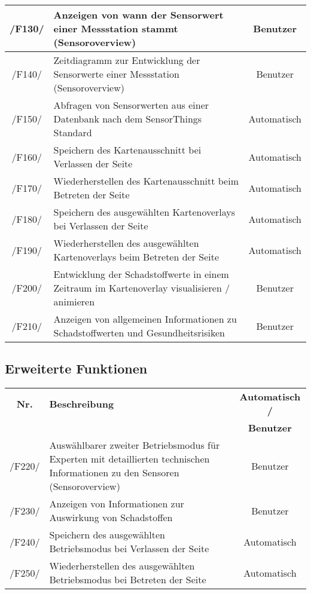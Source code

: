 \begin{tabularx}{\textwidth}{| c | X | c |}
        \hline
        /F130/ & Anzeigen von wann der Sensorwert einer Messstation stammt (Sensoroverview) & Benutzer \\
        \hline
        /F140/ & Zeitdiagramm zur Entwicklung der Sensorwerte einer Messstation (Sensoroverview) & Benutzer \\
        \hline
        /F150/ & Abfragen von Sensorwerten aus einer Datenbank nach dem SensorThings Standard & Automatisch \\
        \hline
        /F160/ & Speichern des Kartenausschnitt bei Verlassen der Seite & Automatisch \\
        \hline
        /F170/ & Wiederherstellen des Kartenausschnitt beim Betreten der Seite & Automatisch \\
        \hline
        /F180/ & Speichern des ausgewählten Kartenoverlays bei Verlassen der Seite & Automatisch \\
        \hline
        /F190/ & Wiederherstellen des ausgewählten Kartenoverlays beim Betreten der Seite & Automatisch \\
        \hline
        /F200/ & Entwicklung der Schadstoffwerte in einem Zeitraum im Kartenoverlay visualisieren / animieren & Benutzer \\
        \hline
        /F210/ & Anzeigen von allgemeinen Informationen zu Schadstoffwerten und Gesundheitsrisiken & Benutzer \\
        \hline
\end{tabularx}
\subsection{Erweiterte Funktionen}
\begin{tabularx}{\textwidth}{| c | X | c |}
\hline
        \textbf{Nr.} & 
        \textbf{Beschreibung} & 
        \textbf{Automatisch /} \\
        & & \textbf{Benutzer} \\
        \hline
        /F220/ & Auswählbarer zweiter Betriebsmodus für Experten mit detaillierten technischen Informationen zu den Sensoren (Sensoroverview) & Benutzer \\
        \hline
        /F230/ & Anzeigen von Informationen zur Auswirkung von Schadstoffen & Benutzer \\
        \hline
        /F240/ & Speichern des ausgewählten Betriebsmodus bei Verlassen der Seite & Automatisch \\
        \hline
        /F250/ & Wiederherstellen des ausgewählten Betriebsmodus bei Betreten der Seite & Automatisch \\
        \hline
\end{tabularx}

